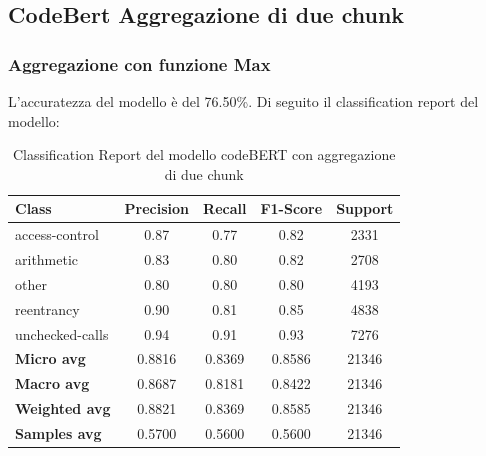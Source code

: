 \documentclass[../../Thesis.tex]{subfiles}
\begin{document}
\subsection{CodeBert Aggregazione di due chunk}
\subsubsection{Aggregazione con funzione Max}
L'accuratezza del modello è del 76.50\%. Di seguito il classification report del modello:

\begin{table}[H]
    \centering
    \small
    \begin{tabular}{lcccc}
    \hline
    \textbf{Class} & \textbf{Precision} & \textbf{Recall} & \textbf{F1-Score} & \textbf{Support} \\
    \hline
    access-control & 0.87 & 0.77 & 0.82 & 2331 \\
    arithmetic & 0.83 & 0.80 & 0.82 & 2708 \\
    other & 0.80 & 0.80 & 0.80 & 4193 \\
    reentrancy & 0.90 & 0.81 & 0.85 & 4838 \\
    unchecked-calls & 0.94 & 0.91 & 0.93 & 7276 \\
    \hline
    \textbf{Micro avg} & 0.8816 & 0.8369 & 0.8586 & 21346 \\
    \textbf{Macro avg} & 0.8687 & 0.8181 & 0.8422 & 21346 \\
    \textbf{Weighted avg} & 0.8821 & 0.8369 & 0.8585 & 21346 \\
    \textbf{Samples avg} & 0.5700 & 0.5600 & 0.5600 & 21346 \\
    \hline
    \end{tabular}
    \caption{Classification Report del modello codeBERT con aggregazione di due chunk}
    \end{table}
\end{document}
